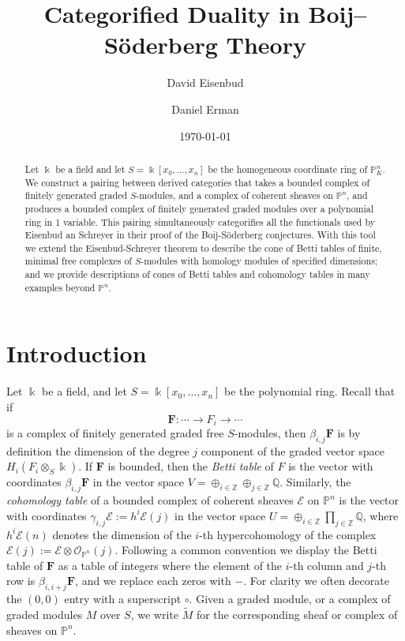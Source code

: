 \documentclass[12pt]{amsart}
\title{Categorified Duality in Boij--S\"oderberg Theory}
\author{David Eisenbud}
\author{Daniel Erman}\thanks{First author supported by an NSF and second author supported by an NSF and by Simons \dots}
\date{\today}
\theoremstyle{definition}
\theoremstyle{remark}
\newcommand{\kk}{\Bbbk}
\newcommand{\PP}{\mathbb{P}}
\newcommand{\ZZ}{\mathbb{Z}}
\newcommand{\QQ}{\mathbb{Q}}
\newcommand{\cO}{\mathcal{O}}
\newcommand{\cE}{\mathcal{E}}
\newcommand{\FF}{\mathbf{F}}
\renewcommand{\P}{{\mathbb P}}
\begin{document}
\maketitle



\begin{abstract} Let $\kk$ be a field and let $S = \kk[x_{0}, \dots,x_{n}]$ be the homogeneous coordinate ring of $\PP^{n}_{K}$.
We construct a pairing between derived categories that takes a bounded complex of
finitely generated graded $S$-modules,  and a complex of coherent sheaves on $\P^{n}$, and produces a bounded complex of finitely generated graded modules over a polynomial ring in 1 variable. This pairing simultaneously categorifies all the functionals used by Eisenbud an Schreyer in their proof of the Boij-S\"oderberg conjectures. With this tool we extend the Eisenbud-Schreyer theorem to describe the cone of Betti tables of finite, minimal free complexes of $S$-modules with homology modules of specified dimensions;  and we provide descriptions of cones of Betti tables and cohomology tables in many examples beyond $\PP^n$.
\end{abstract}


\section*{Introduction}
Let $\kk$ be a field, and let $S=\kk[x_0, \dots, x_n]$ be the polynomial ring. Recall that if 
$$
\FF: \cdots \to F_{i}\to \cdots
$$
is a complex of finitely generated graded free $S$-modules, then $\beta_{i,j}\FF$ is by definition the dimension of the degree $j$ component of the graded vector space $H_{i}(F_{i}\otimes_{S}\kk)$. If $\FF$ is bounded, then the \emph{Betti table} of $F$ is the vector with coordinates $\beta_{i,j}\FF$ in the vector space $V = \oplus_{i\in \ZZ} \oplus_{j\in \ZZ}\QQ$. Similarly, the \emph{cohomology table} of a bounded complex of coherent sheaves $\cE$ on $\PP^{n}$ is the vector with coordinates $\gamma_{i,j}\cE := h^{i}\cE(j)$ in the vector space $U = \oplus_{i\in \ZZ}\prod_{j\in \ZZ}\QQ$, where $h^{i}\cE(n)$ denotes the dimension of the $i$-th hypercohomology of the complex $\cE(j) := \cE \otimes \cO_{\PP^{n}}(j)$. Following a common convention we display the Betti table of $\FF$ as a table
of integers where the element of the $i$-th column and $j$-th row is $\beta_{i,i+j}\FF$, and we replace each zeros with $-$. For clarity we often decorate the $(0,0)$ entry
with a superscript $\circ$.
Given a graded module, or a complex of graded modules $M$ over $S$, we write $\widetilde M$ for the corresponding sheaf or complex of sheaves on $\PP^{n}$. 
\end{document}
